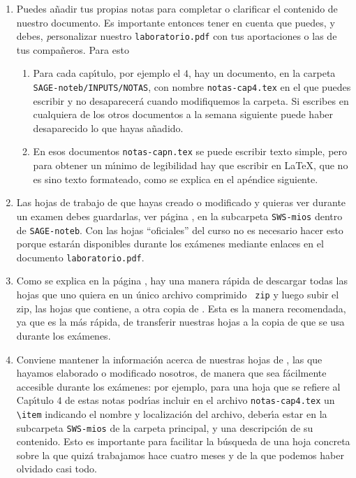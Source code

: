 \begin{appendices}
\begin{enumerate}
\item Puedes a\~nadir tus propias notas para completar o clarificar el contenido
de nuestro documento. Es importante entonces tener en cuenta
que puedes, y debes,  {\emph personalizar} nuestro \verb|laboratorio.pdf| con
tus
aportaciones o las de tus compa\~neros.  Para esto


\begin{enumerate}
 \item Para cada cap\'{\i}tulo, por ejemplo el $4$,  hay un documento, en la
carpeta \verb|SAGE-noteb/INPUTS/NOTAS|, con nombre \verb|notas-cap4.tex| en el
que puedes escribir y no desaparecer\'a cuando modifiquemos la carpeta. Si
escribes en cualquiera
de los otros documentos a la semana siguiente puede haber desaparecido  lo que
hayas
a\~nadido.

\item En esos documentos  \verb|notas-capn.tex| se puede escribir texto simple, 
pero para obtener un m\'{\i}nimo de legibilidad hay que escribir en \LaTeX, que
no es sino texto formateado,  como se explica en el ap\'endice siguiente. 

\end{enumerate}

\item Las hojas de trabajo de {\sage} que hayas creado o modificado  y quieras
ver durante  un examen debes guardarlas, ver
p\'agina \pageref{subir},  en la subcarpeta \verb|SWS-mios| dentro de
\verb|SAGE-noteb|. Con las hojas ``oficiales''  del curso no es necesario hacer
esto porque estar\'an disponibles durante los ex\'amenes mediante enlaces en el
documento \verb|laboratorio.pdf|.

\item Como se explica en la p\'agina \pageref{subir}, hay una manera r\'apida de
descargar todas las hojas que uno quiera en un \'unico archivo comprimido {\tt
zip} y luego subir el zip, las hojas que contiene, a otra copia de {\sage}. Esta
es la manera recomendada, ya que es la m\'as r\'apida,  de transferir nuestras
hojas a la copia de {\sage} que se usa durante los ex\'amenes.

\item Conviene mantener la informaci\'on acerca de nuestras hojas de
{\sage}, las que hayamos elaborado o modificado nosotros,  de manera que sea
f\'acilmente accesible durante los ex\'amenes: por ejemplo, para una hoja que se
refiere al Cap\'{\i}tulo $4$ de estas notas podr\'{\i}as incluir en el archivo
\verb|notas-cap4.tex| un \verb|\item| indicando el nombre y
localizaci\'on del archivo, deber\'{\i}a estar en la subcarpeta \verb|SWS-mios|
de la
carpeta principal,  y una descripci\'on  de su contenido. Esto es
importante  para facilitar la b\'usqueda de una hoja concreta sobre la que
quiz\'a trabajamos hace cuatro meses y de la que podemos haber olvidado casi
todo.  




\end{enumerate}
\end{appendices}
